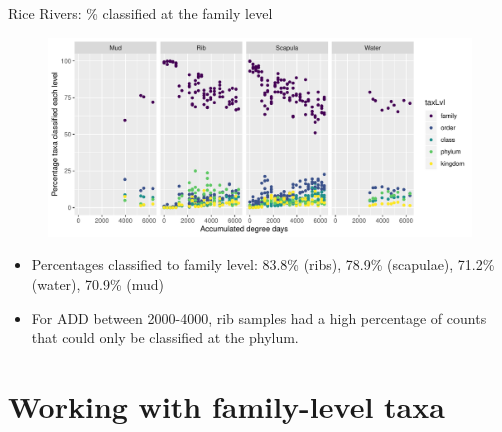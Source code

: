 \documentclass{beamer}
\begin{document}
\begin{frame}{Rice Rivers: \% classified at the family level}

  \begin{center}
    \begin{figure}
      \includegraphics[width=4.5in]{RiceRivers/bacteria/rr_family_perc_classif_by_add_type}
    \end{figure}
  \end{center}
  \vspace{-0.1in}
  {\footnotesize
  \begin{itemize}
    \item Percentages classified to family level: 83.8\% (ribs), 78.9\%
      (scapulae), 71.2\% (water), 70.9\% (mud)
    \item For ADD between 2000-4000, rib samples had a high percentage
      of counts that could only be classified at the phylum.
  \end{itemize}
  }
\end{frame}




\section[Family-level taxa]{Working with family-level taxa}
\end{document}
